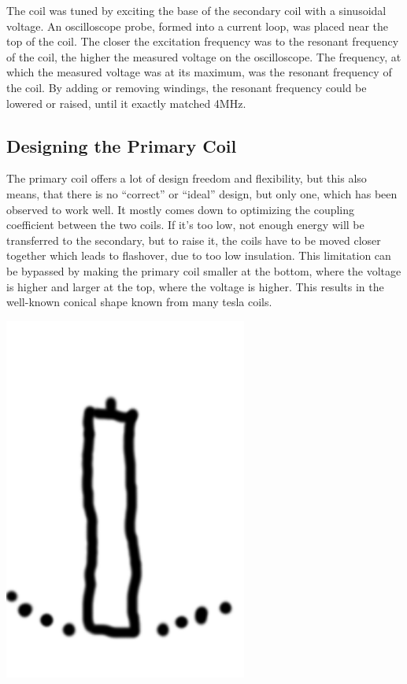 The coil was tuned by exciting the base of the secondary coil with a sinusoidal voltage. An oscilloscope probe, formed into a current loop, was placed near the top of the coil. The closer the excitation frequency was to the resonant frequency of the coil, the higher the measured voltage on the oscilloscope. The frequency, at which the measured voltage was at its maximum, was the resonant frequency of the coil. By adding or removing windings, the resonant frequency could be lowered or raised, until it exactly matched 4MHz.

\subsection{Designing the Primary Coil} \label{TC-designingThePrimary}

The primary coil offers a lot of design freedom and flexibility, but this also means, that there is no \enquote{correct} or \enquote{ideal} design, but only one, which has been observed to work well. It mostly comes down to optimizing the coupling coefficient between the two coils. If it's too low, not enough energy will be transferred to the secondary, but to raise it, the coils have to be moved closer together which leads to flashover, due to too low insulation. %
This limitation can be bypassed by making the primary coil smaller at the bottom, where the voltage is higher and larger at the top, where the voltage is higher. This results in the well-known conical shape known from many tesla coils.

\begin{marginfigure}
\centering
\includegraphics[width=0.6\textwidth]{simon/resources/teslaCoilSketch.png}
\end{marginfigure}

